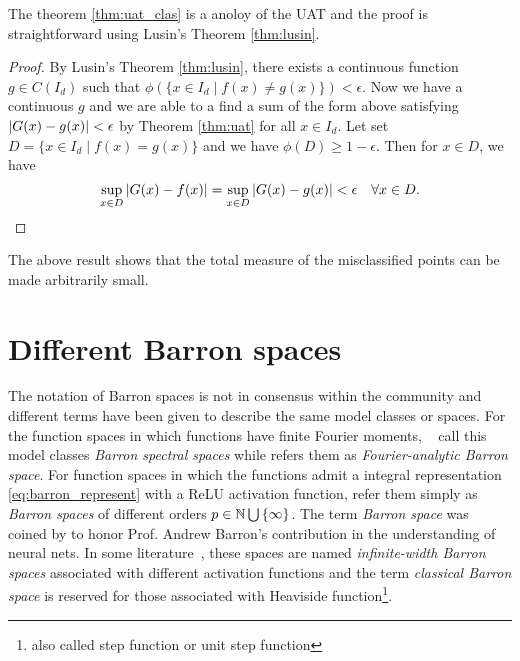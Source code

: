 The theorem \eqref{thm:uat_clas} is a anoloy of the UAT and the proof is
straightforward using Lusin's Theorem \eqref{thm:lusin}.

\begin{proof}
    By Lusin's Theorem \eqref{thm:lusin}, there exists a continuous function $g
    \in C(I_d)$ such that $\phi(\{x\in I_d \mid f(x) \not= g(x)\}) < \epsilon$.
    Now we have a continuous $g$ and we are able to a find a sum of the form
    above satisfying $\left| G(x) - g(x) \right| < \epsilon$ by Theorem \eqref{thm:uat}
    for all $x\in I_d$. Let set $D = \{x\in I_d \mid f(x) = g(x)\}$ and we have
    $\phi(D) \geq 1 - \epsilon$. Then for $x\in D$, we have
    \begin{equation}
        \sup_{x\in D}\left| G(x)-f(x) \right| = \sup_{x\in D}\left| G(x) - g(x) \right| < \epsilon 
        \quad \forall x\in D.
    \end{equation}
\end{proof}

The above result shows that the total measure of the misclassified points can be made arbitrarily small.

\section{Different Barron spaces}

The notation of Barron spaces is not in consensus within the community and
different terms have been given to describe the same model classes or spaces.
For the function spaces in which functions have finite Fourier moments,
~\cite{xuFiniteNeuronMethod2020} call this model classes \textit{Barron spectral
spaces} while \cite{carageaNeuralNetworkApproximation2022} refers them as
\textit{Fourier-analytic Barron space}.  For function spaces in which the
functions admit a integral representation \eqref{eq:barron_represent} with a
ReLU activation function, \cite{eBarronSpaceFlowinduced2021} refer them simply
as \textit{Barron spaces} of different orders $p \in \mathbb{N} \bigcup\,\{\infty\}$.
The term \textit{Barron space} was coined by
\cite{ePrioriEstimatesPopulation2019} to honor Prof. Andrew Barron's
contribution in the understanding of neural nets. In some
literature~\cite{carageaNeuralNetworkApproximation2022}, these spaces are named
\textit{infinite-width Barron spaces} associated with different activation
functions and the term \textit{classical Barron space} is reserved for those
associated with Heaviside function\footnote{also called step function or unit
step function}.

